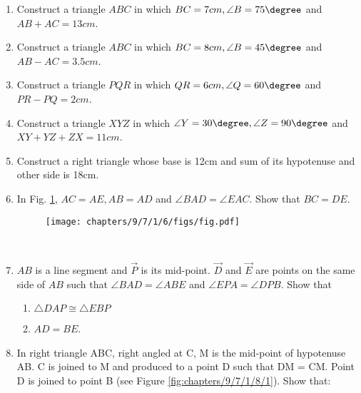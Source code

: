 \begin{enumerate}[label=\thesection.\arabic*,ref=\thesection.\theenumi]
\item Construct a triangle $ABC$ in which $BC=7cm, \angle{B}=75\degree$ and $AB + AC = 13 cm$.
\label{chapters/9/11/2/1}
%
%
\item Construct a triangle $ABC$ in which $BC=8cm, \angle{B}=45\degree$ and $AB - AC = 3.5 cm$.
\label{chapters/9/11/2/2}
\\
\solution

%
\item Construct a triangle $PQR$ in which $QR=6cm, \angle{Q}=60\degree$ and $PR - PQ = 2cm$.
\label{chapters/9/11/2/3}
%
%
\item Construct a triangle $XYZ$ in which $\angle{Y}=30\degree, \angle{Z}=90\degree$ and  $XY+YZ+ZX=11cm$.
\label{chapters/9/11/2/4}
%
%
\item Construct a right triangle whose base is 12cm and sum of its hypotenuse and other side is 18cm.
\label{chapters/9/11/2/5}
%
%
\item In Fig. \ref{fig:chapters/9/7/1/6/1}, $AC=AE,AB=AD$ and $\angle BAD=\angle EAC$. Show that $BC=DE$.
\label{chapters/9/7/1/6}
\begin{figure}[!h]
	\begin{center}
	\texttt{[image: chapters/9/7/1/6/figs/fig.pdf]}
	\end{center}
\caption{}
\label{fig:chapters/9/7/1/6/1}
\end{figure}
\\
\solution

\item 
	$AB$ is a line segment and $\vec{P}$ is its mid-point. $\vec{D}$ and $\vec{E}$ are points on the same side of
$AB$ such that $\angle BAD = \angle ABE$ and $\angle EPA = \angle DPB$. Show that
\label{chapters/9/7/1/7}
\begin{enumerate}
\item $\triangle DAP \cong \triangle EBP$
\item $AD = BE$.
\end{enumerate}
\solution

\item In right triangle ABC, right angled at C, M is the mid-point of hypotenuse AB. C is joined to M and produced to a point D such that DM = CM. Point D is joined to point B (see Figure \ref{fig:chapters/9/7/1/8/1}). Show that:

\end{enumerate}

